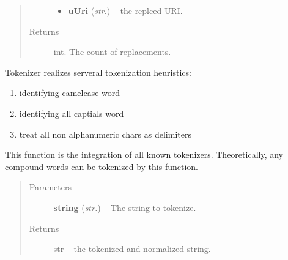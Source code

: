 \documentclass[letterpaper,10pt,english]{sphinxmanual}
\begin{document}
\begin{fulllineitems}
\begin{fulllineitems}
\begin{quote}
\begin{description}
\begin{itemize}
\item {} 
\textbf{uUri} (\emph{str.}) -- the replced URI.

\end{itemize}

\item[{Returns}] \leavevmode
int. The count of replacements.

\end{description}\end{quote}

\end{fulllineitems}


\end{fulllineitems}


\begin{fulllineitems}
\label{api_ref:tokenizer.Tokenizer}
Tokenizer realizes serveral tokenization heuristics:
\begin{enumerate}
\item {} 
identifying camelcase word

\item {} 
identifying all captials word

\item {} 
treat all non alphanumeric chars as delimiters

\end{enumerate}

\begin{fulllineitems}
\label{api_ref:tokenizer.Tokenizer.tokenized}
This function is the integration of all known tokenizers.
Theoretically, any compound words can be tokenized by this 
function.
\begin{quote}\begin{description}
\item[{Parameters}] \leavevmode
\textbf{string} (\emph{str.}) -- The string to tokenize.

\item[{Returns}] \leavevmode
str -- the tokenized and normalized string.

\end{description}\end{quote}

\end{fulllineitems}


\end{fulllineitems}
\end{document}
